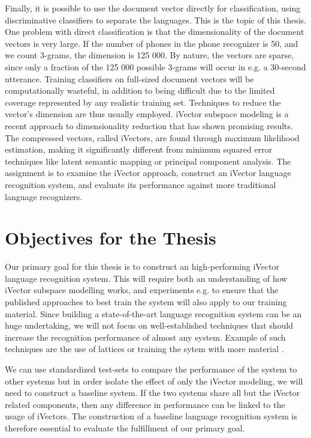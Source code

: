 Finally, it is possible to use the document vector directly for classification, using discriminative classifiers to separate the languages. This is the topic of this thesis. One problem with direct classification is that the dimensionality of the document vectors is very large. If the number of phones in the phone recognizer is 50, and we count 3-grams, the dimension is 125 000. By nature, the vectors are sparse, since only a fraction of the 125 000 possible 3-grams will occur in e.g. a 30-second utterance. Training classifiers on full-sized document vectors will be computationally wasteful, in addition to being difficult due to the limited coverage represented by any realistic training set. Techniques to reduce the vector's dimension are thus usually employed. iVector subspace modeling is a recent approach to dimensionality reduction that has shown promising results. The compressed vectors, called iVectors, are found through maximum likelihood estimation, making it significantly different from minimum squared error techniques like latent semantic mapping or principal component analysis. The assignment is to examine the iVector approach, construct an iVector language recognition system, and evaluate its performance against more traditional language recognizers.

\section{Objectives for the Thesis}

Our primary goal for this thesis is to construct an high-performing iVector language recognition system. This will require both an understanding of how iVector subspace modelling works, and experiments e.g. to ensure that the published approaches to best train the system will also apply to our training material. Since building a state-of-the-art language recognition system can be an huge undertaking, we will not focus on well-established techniques that should increase the recognition performance of almost any system. Example of such techniques are the use of lattices \cite[p. 817]{lidbok} or training the sytem with more material \cite[p. 836]{lidbok}.

We can use standardized test-sets to compare the performance of the system to other systems but in order isolate the effect of only the iVector modeling, we will need to construct a baseline system.  If the two systems share all but the iVector related components, then any difference in performance can be linked to the usage of iVectors. The construction of a  baseline language recognition system is therefore essential to evaluate the fulfillment of our primary goal.

